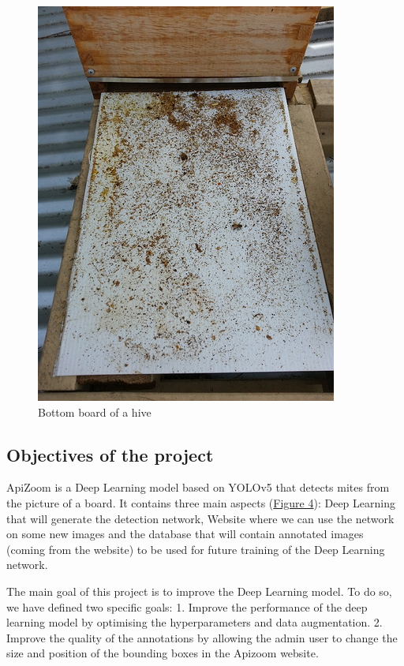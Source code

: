 \documentclass{article}
\begin{document}
\begin{figure}[!ht]
  \centering
  \includegraphics[scale = 0.5]{Bees/board.jpg}
  \caption{Bottom board of a hive}
  \label{Figure 3}
\end{figure}

\subsection{Objectives of the project}

ApiZoom is a Deep Learning model based on YOLOv5 that detects mites from the picture of a board.
It contains three main aspects (\hyperref[Figure 4]{Figure 4}): Deep Learning that will generate the detection network, Website where we can use the network on some new images and the database that will contain annotated images (coming from the website) to be used for future training of the Deep Learning network.

\bigskip

The main goal of this project is to improve the Deep Learning model.
To do so, we have defined two specific goals:
1. Improve the performance of the deep learning model by optimising the hyperparameters and data augmentation.
2. Improve the quality of the annotations by allowing the admin user to change the size and position of the bounding boxes in the Apizoom website.
\end{document}
